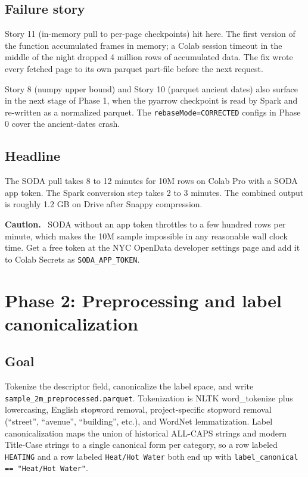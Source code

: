\documentclass[11pt,letterpaper]{book}
\newenvironment{cautionbox}{\begin{framed}\textbf{Caution.}~}{\end{framed}}
\begin{document}
\subsection*{Failure story}

Story 11 (in-memory pull to per-page checkpoints) hit here. The first version of the function accumulated frames in memory; a Colab session timeout in the middle of the night dropped 4 million rows of accumulated data. The fix wrote every fetched page to its own parquet part-file before the next request.

Story 8 (numpy upper bound) and Story 10 (parquet ancient dates) also surface in the next stage of Phase 1, when the pyarrow checkpoint is read by Spark and re-written as a normalized parquet. The \texttt{rebaseMode=CORRECTED} configs in Phase 0 cover the ancient-dates crash.

\subsection*{Headline}

The SODA pull takes 8 to 12 minutes for 10M rows on Colab Pro with a SODA app token. The Spark conversion step takes 2 to 3 minutes. The combined output is roughly 1.2 GB on Drive after Snappy compression.

\begin{cautionbox}
SODA without an app token throttles to a few hundred rows per minute, which makes the 10M sample impossible in any reasonable wall clock time. Get a free token at the NYC OpenData developer settings page and add it to Colab Secrets as \texttt{SODA\_APP\_TOKEN}.
\end{cautionbox}

\section{Phase 2: Preprocessing and label canonicalization}
\label{sec:phase2}

\subsection*{Goal}

Tokenize the descriptor field, canonicalize the label space, and write \texttt{sample\_2m\_preprocessed.parquet}. Tokenization is NLTK word\_tokenize plus lowercasing, English stopword removal, project-specific stopword removal (``street'', ``avenue'', ``building'', etc.), and WordNet lemmatization. Label canonicalization maps the union of historical ALL-CAPS strings and modern Title-Case strings to a single canonical form per category, so a row labeled \texttt{HEATING} and a row labeled \texttt{Heat/Hot Water} both end up with \texttt{label\_canonical == "Heat/Hot Water"}.
\end{document}
